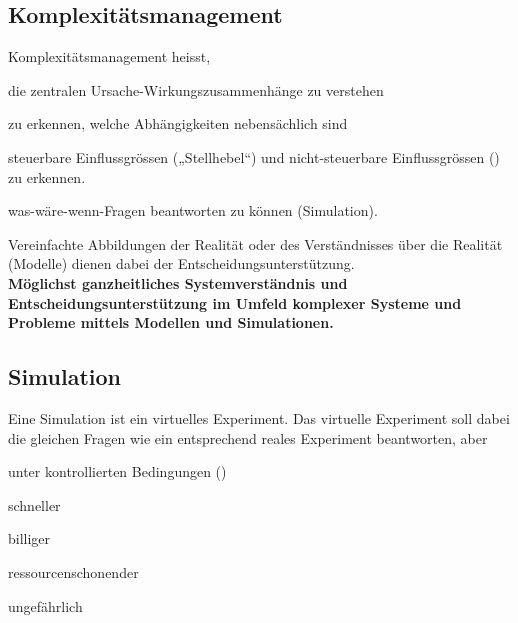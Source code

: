 \subsection{Komplexitätsmanagement}
Komplexitätsmanagement heisst,
\begin{compactitem}
	\item die zentralen Ursache-Wirkungszusammenhänge zu verstehen
	\item zu erkennen, welche Abhängigkeiten nebensächlich sind
	\item steuerbare Einflussgrössen („Stellhebel“) und nicht-steuerbare Einflussgrössen () zu erkennen.
	\item was-wäre-wenn-Fragen beantworten zu können (Simulation).
\end{compactitem}
Vereinfachte Abbildungen der Realität oder des Verständnisses über die Realität (Modelle) dienen dabei der Entscheidungsunterstützung. \\
\textbf{Möglichst ganzheitliches Systemverständnis und Entscheidungsunterstützung im Umfeld komplexer Systeme und Probleme mittels Modellen und Simulationen.}

\subsection{Simulation}
Eine Simulation ist ein virtuelles Experiment. Das virtuelle Experiment soll dabei die gleichen Fragen wie
ein entsprechend reales Experiment beantworten, aber
\begin{multicols}{3}
	\begin{compactitem}
		\item unter kontrollierten Bedingungen ()
		\item schneller
		\item billiger
		\item ressourcenschonender
		\item ungefährlich
	\end{compactitem}
\end{multicols}